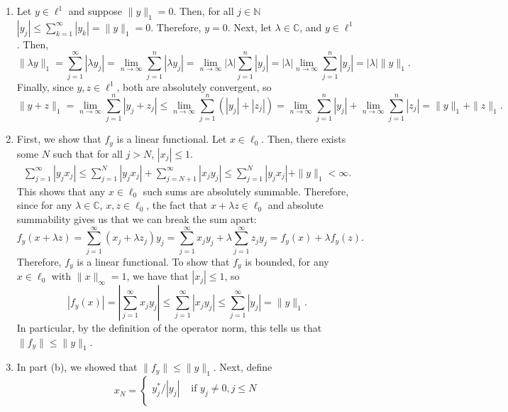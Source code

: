 \documentclass[11pt]{article}
\newcommand{\C}{\mathbb{C}}
\newcommand{\N}{\mathbb{N}}
\begin{document}
\begin{enumerate}[label=\arabic*., leftmargin=*, itemsep=10pt]
\begin{enumerate}
    \item Let $y \in \ell^{1}$ and suppose $\|y\|_{1} = 0$.
        Then, for all $j \in \N$ $|y_j| \leq \sum_{k = 1}^{\infty} |y_k| = \|y\|_{1} = 0$. Therefore, $y = 0$.
        Next, let $\lambda \in \C$, and $y \in \ell^{1}$.
        Then,
        \[
        \|\lambda y \|_{1} = \sum_{j = 1}^{\infty} | \lambda y_j| = \lim_{n \to \infty} \sum_{j = 1}^{n} |\lambda y_j| = \lim_{n \to \infty} |\lambda| \sum_{j = 1}^{n} |y_j| = |\lambda| \lim_{n \to \infty} \sum_{j = 1}^{n} |y_j| = |\lambda| \|y\|_{1}
        .\] 
        Finally, since $y, z \in \ell^{1}$, both are absolutely convergent, so
        \[
        \|y + z\|_{1} = \lim_{n \to \infty}  \sum_{j=1}^{n} |y_j + z_j| \leq \lim_{n \to \infty} \sum_{j = 1}^{n} (|y_j| + |z_j|) = \lim_{n \to \infty}\sum_{j=1}^{n} |y_j| + \lim_{n \to \infty} \sum_{j=1}^{n} |z_j| = \|y\|_{1} + \|z\|_{1}
        .\] 
    \item First, we show that $f_y$ is a linear functional. Let $x \in \ell_{0}$. Then, there exists some $N$ such that for all $j > N$, $|x_j| \leq 1$.
        \begin{align*}
             \sum_{j = 1}^{\infty} |y_j x_j| \leq  \sum_{j=1}^{N} |y_j x_j| + \sum_{j = N+1}^{\infty}| x_j y_j|  \leq  \sum_{j=1}^{N} |y_j x_j|  + \|y\|_{1} < \infty
        .\end{align*}
        This shows that any $x \in \ell_{0}$ such sums are absolutely summable.
        Therefore, since for any $\lambda \in \C$, $x, z \in \ell_{0}$, the fact that $x + \lambda z \in \ell_{0}$ and absolute summability gives us that we can break the sum apart:
        \[
            f_y(x + \lambda z) = \sum_{j = 1}^{\infty} (x_j + \lambda z_j)y_j = \sum_{j = 1}^{\infty} x_j y_j + \lambda \sum_{j = 1}^{\infty} z_j y_j = f_y(x) + \lambda f_y(z)
        .\] 
        Therefore, $f_y$ is a linear functional.
        To show that $f_y$ is bounded, for any $x \in \ell_{0}$ with $\|x\|_{\infty} = 1$, we have that $|x_j| \leq 1$, so
        \[
        |f_y(x)| = \left|\sum_{j = 1}^{\infty} x_j y_j\right| \leq \sum_{j = 1}^{\infty} |x_j y_j| \leq \sum_{j=1}^{\infty} |y_j| = \|y\|_{1}
        .\] 
        In particular, by the definition of the operator norm, this tells us that $\|f_y\| \leq \|y\|_{1}$.
    \item In part (b), we showed that $\|f_y\| \leq \|y\|_{1}$.
        Next, define
        \[
        x_N = \begin{cases}
            y_j^{*} / |y_j| &\text{ if } y_j \neq 0, j \leq N\\

\end{cases}\]
\end{enumerate}
\end{enumerate}
\end{document}
